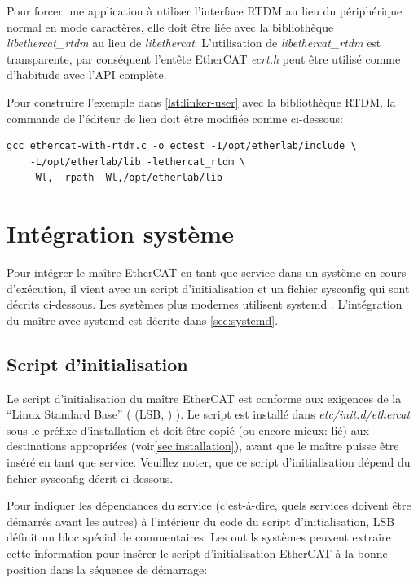 \documentclass[a4paper,12pt,BCOR=6mm,bibtotoc,idxtotoc]{scrbook}
\begin{document}
Pour forcer une application \`a utiliser l'interface RTDM au lieu du
p\'eriph\'erique normal en mode caract\`eres, elle doit \^etre li\'ee avec la
biblioth\`eque \textit{libethercat\_rtdm} au lieu de
\textit{libethercat}.  L'utilisation de \textit{libethercat\_rtdm} est
transparente, par cons\'equent l'ent\^ete EtherCAT \textit{ecrt.h} peut
\^etre utilis\'e comme d'habitude avec l'API compl\`ete.

Pour construire l'exemple dans \autoref{lst:linker-user} avec la
biblioth\`eque RTDM, la commande de l'\'editeur de lien doit \^etre modifi\'ee
comme ci-dessous:

\begin{lstlisting}
gcc ethercat-with-rtdm.c -o ectest -I/opt/etherlab/include \
    -L/opt/etherlab/lib -lethercat_rtdm \
    -Wl,--rpath -Wl,/opt/etherlab/lib
\end{lstlisting}


\section{Int\'egration syst\`eme}
\label{sec:system}

Pour int\'egrer le ma\^itre EtherCAT en tant que service dans un
syst\`eme en cours d'ex\'ecution, il vient avec un script
d'initialisation et un fichier sysconfig qui sont d\'ecrits
ci-dessous.  Les syst\`emes plus modernes utilisent systemd
\cite{systemd}.  L'int\'egration du ma\^itre avec systemd est
d\'ecrite dans \autoref{sec:systemd}.

\subsection{Script d'initialisation}
\label{sec:init}

Le script d'initialisation du ma\^itre EtherCAT est conforme aux
exigences de la ``Linux Standard Base'' ( (LSB, \cite{lsb})
).  Le script est install\'e dans \textit{etc/init.d/ethercat} sous le
pr\'efixe d'installation et doit \^etre copi\'e (ou encore mieux:
li\'e) aux destinations appropri\'ees
(voir\autoref{sec:installation}), avant que le ma\^itre puisse \^etre
ins\'er\'e en tant que service.  Veuillez noter, que ce script
d'initialisation d\'epend du fichier sysconfig d\'ecrit ci-dessous.

Pour indiquer les d\'ependances du service (c'est-\`a-dire, quels
services doivent \^etre d\'emarr\'es avant les autres) \`a
l'int\'erieur du code du script d'initialisation, LSB d\'efinit un
bloc sp\'ecial de commentaires.  Les outils syst\`emes peuvent
extraire cette information pour ins\'erer le script d'initialisation
EtherCAT \`a la bonne position dans la s\'equence de d\'emarrage:
\end{document}
